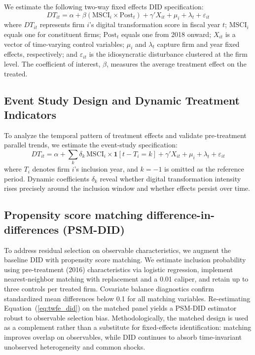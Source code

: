 We estimate the following two-way fixed effects DID specification:
\begin{equation}
\label{eq:twfe_did}
DT_{it} = \alpha + \beta\left(\mathrm{MSCI}_i \times \mathrm{Post}_t\right) + \gamma' X_{it} + \mu_i + \lambda_t + \varepsilon_{it}
\end{equation}
where $DT_{it}$ represents firm $i$'s digital transformation score in fiscal year $t$; $\mathrm{MSCI}_i$ equals one for constituent firms; $\mathrm{Post}_t$ equals one from 2018 onward; $X_{it}$ is a vector of time-varying control variables; $\mu_i$ and $\lambda_t$ capture firm and year fixed effects, respectively; and $\varepsilon_{it}$ is the idiosyncratic disturbance clustered at the firm level. The coefficient of interest, $\beta$, measures the average treatment effect on the treated.

\subsection{Event Study Design and Dynamic Treatment Indicators}

To analyze the temporal pattern of treatment effects and validate pre-treatment parallel trends, we estimate the event-study specification:
\begin{equation}
\label{eq:event_study}
DT_{it} = \alpha + \sum_{k} \delta_k \, \mathrm{MSCI}_i \times \mathbf{1}[t - T_i = k] + \gamma' X_{it} + \mu_i + \lambda_t + \varepsilon_{it}
\end{equation}
where $T_i$ denotes firm $i$'s inclusion year, and $k = -1$ is omitted as the reference period. Dynamic coefficients $\delta_k$ reveal whether digital transformation intensity rises precisely around the inclusion window and whether effects persist over time.

\subsection{Propensity score matching difference-in-differences (PSM-DID)}

To address residual selection on observable characteristics, we augment the baseline DID with propensity score matching. We estimate inclusion probability using pre-treatment (2016) characteristics via logistic regression, implement nearest-neighbor matching with replacement and a 0.01 caliper, and retain up to three controls per treated firm. Covariate balance diagnostics confirm standardized mean differences below 0.1 for all matching variables. Re-estimating Equation~(\ref{eq:twfe_did}) on the matched panel yields a PSM-DID estimator robust to observable selection bias. Methodologically, the matched design is used as a complement rather than a substitute for fixed-effects identification: matching improves overlap on observables, while DID continues to absorb time-invariant unobserved heterogeneity and common shocks.

